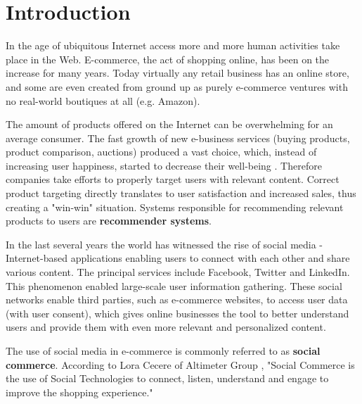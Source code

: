 \documentclass[12pt]{report}
\begin{document}
\tableofcontents	%


\chapter{Introduction} \label{ch.intro} 
In the age of ubiquitous Internet access more and more human activities take place in the Web. E-commerce, the act of shopping online, has been on the increase for many years. Today virtually any retail business has an online store, and some are even created from ground up as purely e-commerce ventures with no real-world boutiques at all (e.g. Amazon).

The amount of products offered on the Internet can be overwhelming for an average consumer. The fast growth of new e-business services (buying products, product comparison, auctions) produced a vast choice, which, instead of increasing user happiness, started to decrease their well-being \cite{rec_sys_handbook}. Therefore companies take efforts to properly target users with relevant content. Correct product targeting directly translates to user satisfaction and increased sales, thus creating a "win-win" situation. Systems responsible for recommending relevant products to users are {\bf recommender systems}.

In the last several years the world has witnessed the rise of social media - Internet-based applications enabling users to connect with each other and share various content. The principal services include Facebook, Twitter and LinkedIn. This phenomenon enabled large-scale user information gathering. These social networks enable third parties, such as e-commerce websites, to access user data (with user consent), which gives online businesses the tool to better understand users and provide them with even more relevant and personalized content.

The use of social media in e-commerce is commonly referred to as {\bf social commerce}. According to Lora Cecere of Altimeter Group \cite{rise_of_social_commerce}, "Social Commerce is the use of Social Technologies to connect, listen, understand and engage to improve the shopping experience."

\end{document}
